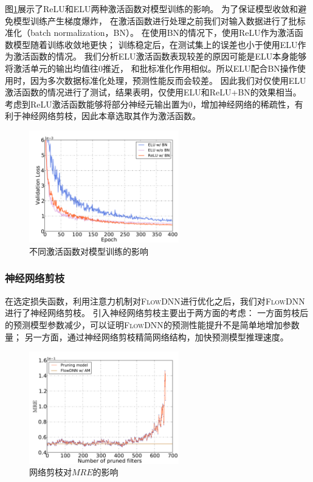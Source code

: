 图\ref{fig:activation}展示了ReLU和ELU两种激活函数对模型训练的影响。
为了保证模型收敛和避免模型训练产生梯度爆炸，
在激活函数进行处理之前我们对输入数据进行了批标准化（batch normalization，BN）。
在使用BN的情况下，使用ReLU作为激活函数模型随着训练收敛地更快；
训练稳定后，在测试集上的误差也小于使用ELU作为激活函数的情况。
我们分析ELU激活函数表现较差的原因可能是ELU本身能够将激活单元的输出均值往0推近，
和批标准化作用相似。所以ELU配合BN操作使用时，因为多次数据标准化处理，预测性能反而会较差。
因此我们对仅使用ELU激活函数的情况进行了测试，结果表明，仅使用ELU和ReLU+BN的效果相当。
考虑到ReLU激活函数能够将部分神经元输出置为0，增加神经网络的稀疏性，有利于神经网络剪枝，因此本章选取其作为激活函数。

\begin{figure}[htp]
	\centering
	\includegraphics[width=0.58\textwidth]{./figures/data/activation_comp.pdf}
	\caption{不同激活函数对模型训练的影响}
	\label{fig:activation}	
\end{figure}


\subsubsection{神经网络剪枝}

在选定损失函数，利用注意力机制对\textsc{FlowDNN}进行优化之后，我们对\textsc{FlowDNN}进行了神经网络剪枝。
引入神经网络剪枝主要出于两方面的考虑：
一方面剪枝后的预测模型参数减少，可以证明\textsc{FlowDNN}的预测性能提升不是简单地增加参数量；
另一方面，通过神经网络剪枝精简网络结构，加快预测模型推理速度。

\begin{figure}[htp]
	\centering
	\includegraphics[width=0.58\textwidth]{./figures/data/pruning_result.pdf}
	\caption{网络剪枝对$MRE$的影响}
	\label{fig:pruning_result}	
\end{figure}

